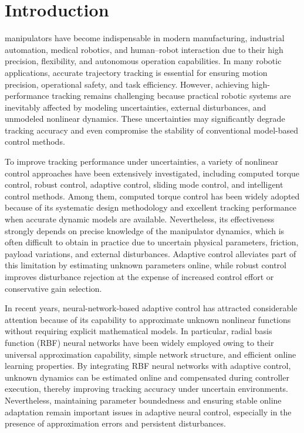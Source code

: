 \section{Introduction}

 manipulators have become indispensable in modern manufacturing, industrial automation, medical robotics, and human–robot interaction due to their high precision, flexibility, and autonomous operation capabilities. In many robotic applications, accurate trajectory tracking is essential for ensuring motion precision, operational safety, and task efficiency. However, achieving high-performance tracking remains challenging because practical robotic systems are inevitably affected by modeling uncertainties, external disturbances, and unmodeled nonlinear dynamics. These uncertainties may significantly degrade tracking accuracy and even compromise the stability of conventional model-based control methods.

To improve tracking performance under uncertainties, a variety of nonlinear control approaches have been extensively investigated, including computed torque control, robust control, adaptive control, sliding mode control, and intelligent control methods. Among them, computed torque control has been widely adopted because of its systematic design methodology and excellent tracking performance when accurate dynamic models are available. Nevertheless, its effectiveness strongly depends on precise knowledge of the manipulator dynamics, which is often difficult to obtain in practice due to uncertain physical parameters, friction, payload variations, and external disturbances. Adaptive control alleviates part of this limitation by estimating unknown parameters online, while robust control improves disturbance rejection at the expense of increased control effort or conservative gain selection.

In recent years, neural-network-based adaptive control has attracted considerable attention because of its capability to approximate unknown nonlinear functions without requiring explicit mathematical models. In particular, radial basis function (RBF) neural networks have been widely employed owing to their universal approximation capability, simple network structure, and efficient online learning properties. By integrating RBF neural networks with adaptive control, unknown dynamics can be estimated online and compensated during controller execution, thereby improving tracking accuracy under uncertain environments. Nevertheless, maintaining parameter boundedness and ensuring stable online adaptation remain important issues in adaptive neural control, especially in the presence of approximation errors and persistent disturbances.

